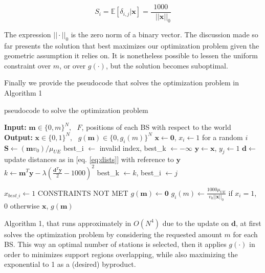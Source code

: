 \documentclass[conference,10pt]{IEEEtran}
\begin{document}
\begin{equation}
S_i = \mathbb{E}{[\delta_{i, j}| \mathbf{x}]} =  \frac{1000}{\textrm{ }||\mathbf{x}||_0}
\end{equation} 

The expression $||\cdot||_0$ is the zero norm of a binary vector. The discussion made so far presents the solution that best maximizes our optimization problem given the geometric assumption it relies on. It is nonetheless possible to lessen the uniform constraint over $m$, or over $g(\cdot)$, but the solution becomes suboptimal. 

Finally we provide the pseudocode that solves the optimization problem in Algorithm 1

\begin{algorithm}
	\caption{pseudocode to solve the optimization problem}
	\begin{algorithmic}
		\STATE \textbf{Input:} $\mathbf{m} \in \{0, m\}^N, \textrm{ } F$, positions of each BS with respect to the world
		\STATE \textbf{Output:} $\mathbf{x} \in \{0, 1\}^N, \textrm{ } g(\mathbf{m}) \in \{0, g_i(m)\}^N$
		\STATE \null
			\STATE $\mathbf{x} \leftarrow \mathbf{0}$, $x_i \leftarrow 1$ for a random $i$
			\STATE $\mathbf{S} \leftarrow (\mathbf{m}v_0)/\mu_{U\!E}$
				\STATE best_i $\leftarrow$ invalid index, best_k $\leftarrow -\infty$ 
					\STATE $\mathbf{y} \leftarrow \mathbf{x}$, $y_j \leftarrow 1$
					\STATE $\mathbf{d} \leftarrow$ update distances as in [eq. \ref{eq:dists}] with reference to    	$\mathbf{y}$
					\STATE $k \leftarrow \mathbf{m}^T\mathbf{y} - \lambda\left(\frac{\mathbf{d}^T\mathbf{y}}{2} - 1000\right)^2$
						\STATE best_k $\leftarrow k$, best_i  $\leftarrow j$
					\ENDIF
				\ENDFOR 
				
					\STATE $x_{best\_i} \leftarrow 1$
				\ELSE
					\STATE CONSTRAINTS NOT MET
				\ENDIF
			\ENDWHILE
			\STATE $g(\mathbf{m}) \leftarrow \mathbf{0}$
				\STATE 	$g_i(m)\leftarrow \frac{1000\mu_{U\!E}}{v_0||\mathbf{x}||_0}$ if $x_i=1$, 0 otherwise
 			\ENDFOR
			\RETURN $\mathbf{x}$, $g(\mathbf{m})$
	\end{algorithmic}
\end{algorithm}


Algorithm 1, that runs approximately in $O(N^4)$ due to the update on $\mathbf{d}$, at first solves the optimization problem by considering the requested amount $m$ for each BS. This way an optimal number of stations is selected, then it applies $g(\cdot)$ in order to minimizes support regions overlapping, while also maximizing the exponential to 1 as a (desired) byproduct.
\end{document}

